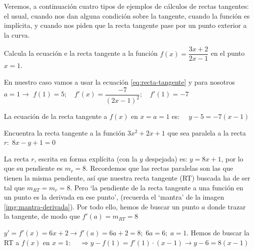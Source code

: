 	Veremos, a continuación cuatro tipos de ejemplos de cálculos de rectas tangentes: el usual, cuando nos dan alguna condición sobre la tangente, cuando la función es implícita, y cuando nos piden que la recta tangente pase por un punto exterior a la curva.
	
	\begin{ejem}
		Calcula la ecuación e la recta tangente a la función $f(x)=\dfrac {3x+2}{2x-1}$ en el punto $x=1$.
		
		En nuestro caso vamos a usar la ecuación \ref{eq:recta-tangente} y para nosotros $a=1 \to $
		$f(1)=5; \quad f'(x)=\dfrac{-7}{(2x-1)^2}; \quad f'(1)=-7$
		
		La ecuación de la recta tangente a $f(x)$ en $x=a=1$ es: $\quad y-5=-7(x-1)$
		
	\end{ejem}
	
	\begin{ejem}
		Encuentra la recta tangente a la función $3x^2+2x+1$ que sea paralela a la recta $r:\; 8x-y+1=0$
		
		La recta $r$, escrita en forma explícita (con la $y$ despejada) es: $y=8x+1$, por lo que su pendiente es $m_r=8$. Recordemos que las rectas paralelas son las que tienen la misma pendiente, así que nuestra recta tangente (RT) buscada ha de ser tal que $m_{RT}=m_r=8$. Pero `la pendiente de la recta tangente a una función en un punto es la derivada en ese punto', (recuerda el `mantra' de la imagen \ref{img:mantra-derivada}). Por todo ello, hemos de buscar un punto $a$ donde trazar la tangente, de modo que $f'(a)=m_{RT}=8$
		
		$y'=f'(x)=6x+2 \to f'(a)=6a+2=8; \; 6a=6;\; a=1$. Hemos de buscar la RT a $f(x)$ en $x=1$: $\quad \Rightarrow y-f(1)=f'(1)\cdot (x-1) \to y-6=8(x-1)$
	\end{ejem}
	

